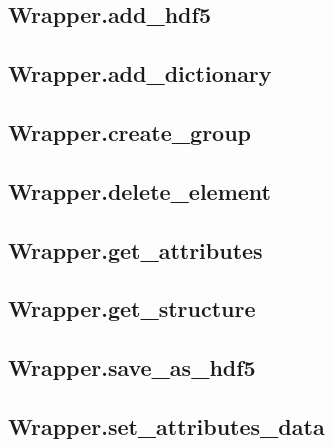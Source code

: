 
\subsection{Wrapper.add\_hdf5} \label{subchapter:wrapper.add_hdf5}
    

%     

\subsection{Wrapper.add\_dictionary} \label{subchapter:wrapper.add_dictionary}
    

\subsection{Wrapper.create\_group} \label{subchapter:wrapper.create_group}
    

\subsection{Wrapper.delete\_element} \label{subchapter:wrapper.delete_element}
    

\subsection{Wrapper.get\_attributes} \label{subchapter:wrapper.get_attributes}
        

\subsection{Wrapper.get\_structure} \label{subchapter:wrapper.get_structure}
       

\subsection{Wrapper.save\_as\_hdf5} \label{subchapter:wrapper.save_as_hdf5}
    

\subsection{Wrapper.set\_attributes\_data} \label{subchapter:wrapper.set_attributes_data}
    
